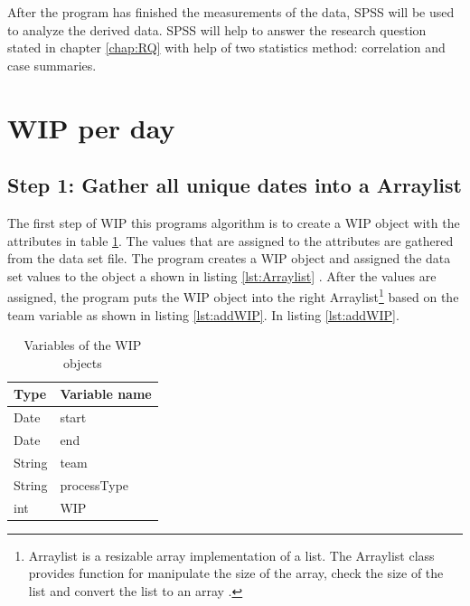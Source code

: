 \documentclass[UKenglish]{ifimaster}  %
\begin{document}
After the program has finished the measurements of the data, SPSS will be used to analyze the derived data. SPSS will help to answer the research question stated in chapter \ref{chap:RQ} with help of two statistics method: correlation and case summaries. 


\section {WIP per day}
\label{WPD}


\subsection{Step 1: Gather all unique dates into a Arraylist}
\label{sub:stepOne}
The first step of WIP this programs algorithm is to create a WIP object with the attributes in table \ref{tab:object}.  The values that are assigned to the attributes are gathered from the data set file.  The program creates a WIP object and assigned the data set values to the object a shown in listing \ref{lst:Arraylist} . After the values are assigned, the program puts the WIP object into the right Arraylist\footnote{Arraylist is a resizable array implementation of a list. The Arraylist class provides function for manipulate the size of the array, check the size of the list and convert the list to an array  \parencite{Arraylist}.} based on the team variable as shown in listing \ref{lst:addWIP}. In listing \ref{lst:addWIP}.
\begin{table}[!ht]
\begin{center}
\begin{tabular}{| l | l |}
\hline
\bf{Type} & \bf{Variable name} \\ \hline
Date & start \\ \hline
Date & end\\ \hline
String & team\\ \hline
String & processType\\ \hline
int  & WIP\\ \hline
\end{tabular}
\caption{Variables of the WIP objects}
\label{tab:object}
\end{center}
\end{table}
\end{document}
